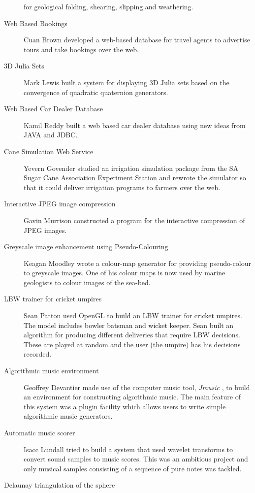 \begin{description}
          for geological folding, shearing, slipping and weathering.
\item[ Web Based Bookings ]
      Cuan Brown developed a web-based database for travel agents to
          advertise tours and take bookings over the web.
\item[ 3D Julia Sets ]
      Mark Lewis built a system for displaying 3D Julia sets based on
          the convergence of quadratic quaternion generators.
\item[ Web Based Car Dealer Database ]
      Kamil Reddy built a web based car dealer database using new
          ideas from JAVA and JDBC.
\item[ Cane Simulation Web Service ]
      Yevern Govender studied an irrigation simulation package from the SA
          Sugar Cane Association Experiment Station and rewrote the simulator so that it could
          deliver irrigation programs to farmers over the web.
\item[ Interactive JPEG image compression ]
      Gavin Murrison constructed a program for
          the interactive compression of JPEG images.
\item[ Greyscale image enhancement using Pseudo-Colouring ]
      Keagan Moodley wrote a colour-map generator for providing
          pseudo-colour to greyscale images. One of his colour maps
          is now used by marine geologists to colour images of the sea-bed.
 \item[ LBW trainer for cricket umpires]
          Sean Patton used OpenGL to build an
          LBW trainer for cricket umpires.
          The model includes bowler batsman and wicket keeper.
          Sean built an algorithm for producing different deliveries that
          require LBW decisions.
          These are played at random and the user (the umpire)
          has his decisions recorded.
\item[ Algorithmic music environment ]
           Geoffrey Devantier made use of the computer music tool,
          {\em  Jmusic },
          to build an environment for constructing algorithmic music.
          The main feature of this system was a plugin facility which
          allows users to write simple algorithmic music generators.
\item[ Automatic music scorer ]
          Isacc Lundall tried to build a system that used wavelet
          transforms to convert sound samples to music scores. This was an
          ambitious project and only musical samples consisting of
          a sequence of pure notes was tackled.
\item[ Delaunay triangulation of the sphere]

\end{description}
